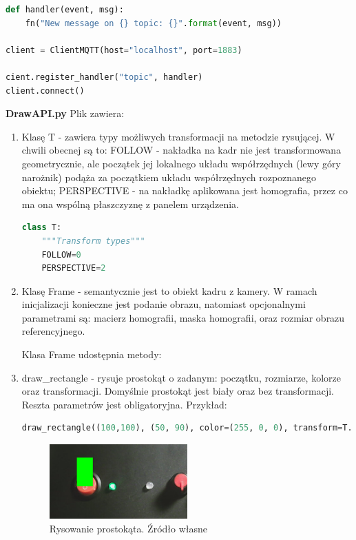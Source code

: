 \documentclass[12pt,twoside,polish]{article}
\begin{document}
\begin{lstlisting}[language=Python, caption=Tworzenie instancji klienta]
def handler(event, msg):
	fn("New message on {} topic: {}".format(event, msg))

client = ClientMQTT(host="localhost", port=1883)

cient.register_handler("topic", handler)
client.connect()
\end{lstlisting}

\textbf{DrawAPI.py}
Plik zawiera:

\begin{enumerate}[label=\alph*), leftmargin=1.25cm]
\item Klasę T - zawiera typy możliwych transformacji na metodzie rysującej. W chwili obecnej są to: FOLLOW - nakładka na kadr nie jest transformowana geometrycznie, ale początek jej lokalnego układu współrzędnych (lewy góry narożnik) podąża za początkiem układu współrzędnych rozpoznanego obiektu; PERSPECTIVE - na nakładkę aplikowana jest homografia, przez co ma ona wspólną płaszczyznę z panelem urządzenia.

\begin{lstlisting}[language=Python]
class T:
	"""Transform types"""
	FOLLOW=0
	PERSPECTIVE=2
\end{lstlisting}

\item Klasę Frame - semantycznie jest to obiekt kadru z kamery. W ramach inicjalizacji konieczne jest podanie obrazu, natomiast opcjonalnymi parametrami są: macierz homografii, maska homografii, oraz rozmiar obrazu referencyjnego.

Klasa Frame udostępnia metody:

\item draw\_rectangle - rysuje prostokąt o zadanym: początku, rozmiarze, kolorze oraz transformacji. Domyślnie prostokąt jest biały oraz bez transformacji. Reszta parametrów jest obligatoryjna. Przykład:
\begin{lstlisting}[language=Python]
draw_rectangle((100,100), (50, 90), color=(255, 0, 0), transform=T.PERSPECTIVE)
\end{lstlisting}
\begin{figure}[h]
	\centering
	\includegraphics[width=0.5\textwidth]{draw_rect}
	\caption{Rysowanie prostokąta. Źródło własne}
\end{figure}


\end{enumerate}
\end{document}

